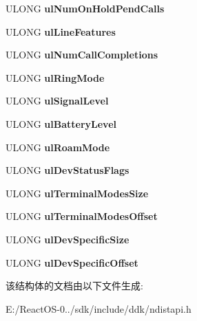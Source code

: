 \begin{DoxyCompactItemize}
\mbox{\label{struct___l_i_n_e___d_e_v___s_t_a_t_u_s_a20d7d1cbd8a2f229394bd99a4590f8f9}} 
U\+L\+O\+NG {\bfseries ul\+Num\+On\+Hold\+Pend\+Calls}
\item 
\mbox{\label{struct___l_i_n_e___d_e_v___s_t_a_t_u_s_af365dc5329b67b83ff60c44a4a8c3b87}} 
U\+L\+O\+NG {\bfseries ul\+Line\+Features}
\item 
\mbox{\label{struct___l_i_n_e___d_e_v___s_t_a_t_u_s_a6af1b37007d6c52f6c79d13d2debd622}} 
U\+L\+O\+NG {\bfseries ul\+Num\+Call\+Completions}
\item 
\mbox{\label{struct___l_i_n_e___d_e_v___s_t_a_t_u_s_a7713d80b6e26dcb060865ee5dee363fc}} 
U\+L\+O\+NG {\bfseries ul\+Ring\+Mode}
\item 
\mbox{\label{struct___l_i_n_e___d_e_v___s_t_a_t_u_s_ad85511909cde528c3e623ebd6f080306}} 
U\+L\+O\+NG {\bfseries ul\+Signal\+Level}
\item 
\mbox{\label{struct___l_i_n_e___d_e_v___s_t_a_t_u_s_a9b2479b853de981cc9d9d6d95536e0e3}} 
U\+L\+O\+NG {\bfseries ul\+Battery\+Level}
\item 
\mbox{\label{struct___l_i_n_e___d_e_v___s_t_a_t_u_s_a15c09382a79c3eee4cb83cdb3fdd0b1f}} 
U\+L\+O\+NG {\bfseries ul\+Roam\+Mode}
\item 
\mbox{\label{struct___l_i_n_e___d_e_v___s_t_a_t_u_s_a8d7f2f39d8160af8096a8c9d360c1562}} 
U\+L\+O\+NG {\bfseries ul\+Dev\+Status\+Flags}
\item 
\mbox{\label{struct___l_i_n_e___d_e_v___s_t_a_t_u_s_a972eba454afc6df93766be3873838599}} 
U\+L\+O\+NG {\bfseries ul\+Terminal\+Modes\+Size}
\item 
\mbox{\label{struct___l_i_n_e___d_e_v___s_t_a_t_u_s_ad60f0f9a8c1e215b00b9dd5ef6d344da}} 
U\+L\+O\+NG {\bfseries ul\+Terminal\+Modes\+Offset}
\item 
\mbox{\label{struct___l_i_n_e___d_e_v___s_t_a_t_u_s_a36af53bb11ae4ce499142de5a06b98b2}} 
U\+L\+O\+NG {\bfseries ul\+Dev\+Specific\+Size}
\item 
\mbox{\label{struct___l_i_n_e___d_e_v___s_t_a_t_u_s_a4022f55264b9f9344e47ac59a0318486}} 
U\+L\+O\+NG {\bfseries ul\+Dev\+Specific\+Offset}
\end{DoxyCompactItemize}


该结构体的文档由以下文件生成\+:\begin{DoxyCompactItemize}
\item 
E\+:/\+React\+O\+S-\/0../sdk/include/ddk/ndistapi.\+h\end{DoxyCompactItemize}

